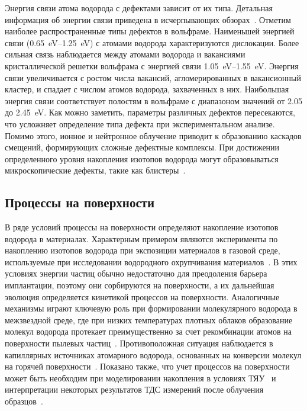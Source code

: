 Энергия связи атома водорода с дефектами зависит от их типа. Детальная информация об энергии связи приведена в исчерпывающих обзорах~\cite{Ogorodnikova2015,Li2020,Persianova2024}. Отметим наиболее распространенные типы дефектов в вольфраме. Наименьшей энергией связи (\SIrange{0.65}{1.25}{\electronvolt}) с атомами водорода характеризуются дислокации. Более сильная связь наблюдается между атомами водорода и вакансиями кристаллической решетки вольфрама с энергией связи \SIrange{1.05}{1.55}{\electronvolt}. Энергия связи увеличивается с ростом числа вакансий, агломерированных в вакансионный кластер, и спадает с числом атомов водорода, захваченных в них. Наибольшая энергия связи соответствует полостям в вольфраме с диапазоном значений от \num{2.05} до \SI{2.45}{\electronvolt}. Как можно заметить, параметры различных дефектов пересекаются, что усложняет определение типа дефекта при экспериментальном анализе. Помимо этого, ионное и нейтронное облучение приводит к образованию каскадов смещений, формирующих сложные дефектные комплексы. При достижении определенного уровня накопления изотопов водорода могут образовываться микроскопические дефекты, такие как блистеры~\cite{Wang2001}.

\subsection{Процессы на поверхности}\label{subsec:ch1/sec4/subsec3}

В ряде условий процессы на поверхности определяют накопление изотопов водорода в материалах. Характерным примером являются эксперименты по накоплению изотопов водорода при экспозиции материалов в газовой среде, используемые при исследовании водородного охрупчивания материалов~\cite{Louthan2008}. В этих условиях энергии частиц обычно недостаточно для преодоления барьера имплантации, поэтому они сорбируются на поверхности, а их дальнейшая эволюция определяется кинетикой процессов на поверхности. Аналогичные механизмы играют ключевую роль при формировании молекулярного водорода в межзвездной среде, где при низких температурах плотных облаков образование молекул водорода протекает преимущественно за счет рекомбинации атомов на поверхности пылевых частиц~\cite{Katz1999, Hama2013}. Противоположная ситуация наблюдается в капиллярных источниках атомарного водорода, основанных на конверсии молекул на горячей поверхности~\cite{Tschersich2000, Tschersich2008}. Показано также, что учет процессов на поверхности может быть необходим при моделировании накопления в условиях ТЯУ~\cite{Guterl2019} и интерпретации некоторых результатов ТДС измерений после облучения образцов~\cite{Hodille2017, Matveev2018}.

